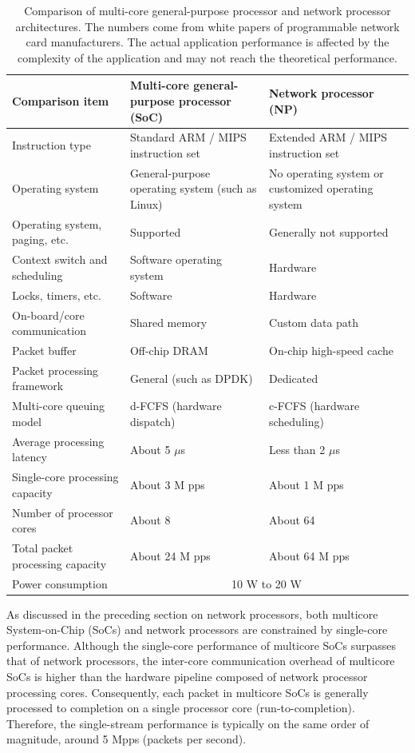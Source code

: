 \begin{table}[htbp]
	\centering
	\caption{Comparison of multi-core general-purpose processor and network processor architectures. The numbers come from white papers of programmable network card manufacturers. The actual application performance is affected by the complexity of the application and may not reach the theoretical performance.}
	\small
	\begin{tabular}{l|p{}|p{}}
		\hline
		Comparison item & Multi-core general-purpose processor (SoC) & Network processor (NP) \\
		\hline
		\hline
		Instruction type & Standard ARM / MIPS instruction set & Extended ARM / MIPS instruction set \\
		\hline
		Operating system & General-purpose operating system (such as Linux) & No operating system or customized operating system \\
		\hline
		Operating system, paging, etc. & Supported & Generally not supported \\
		\hline
		Context switch and scheduling & Software operating system & Hardware \\
		\hline
		Locks, timers, etc. & Software & Hardware \\
		\hline
		On-board/core communication & Shared memory & Custom data path \\
		\hline
		Packet buffer & Off-chip DRAM & On-chip high-speed cache \\
		\hline
		Packet processing framework & General (such as DPDK) & Dedicated \\
		\hline
		Multi-core queuing model & d-FCFS (hardware dispatch) & c-FCFS (hardware scheduling) \\
		\hline
		Average processing latency & About 5 $\mu$s & Less than 2 $\mu$s \\
		\hline
		Single-core processing capacity & About 3 M pps & About 1 M pps \\
		\hline
		Number of processor cores & About 8 & About 64 \\
		\hline
		Total packet processing capacity & About 24 M pps & About 64 M pps \\
		\hline
		Power consumption & \multicolumn{2}{c}{10 W to 20 W} \\ 
		\hline
	\end{tabular}
	\label{background:tab:soc-vs-np}
\end{table}

As discussed in the preceding section on network processors, both multicore System-on-Chip (SoCs) and network processors are constrained by single-core performance. Although the single-core performance of multicore SoCs surpasses that of network processors, the inter-core communication overhead of multicore SoCs is higher than the hardware pipeline composed of network processor processing cores. Consequently, each packet in multicore SoCs is generally processed to completion on a single processor core (run-to-completion). Therefore, the single-stream performance is typically on the same order of magnitude, around 5 Mpps (packets per second).

